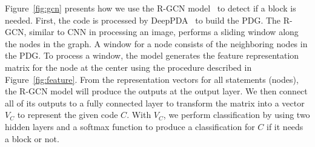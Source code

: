 Figure~\ref{fig:gcn} presents how we use the R-GCN model~\cite{yi} to
detect if a  block is needed.
First, the code is processed by DeepPDA~\cite{icse23} to build
the PDG. The R-GCN, similar to CNN in processing an image, performs
a sliding window along the nodes in the graph. A window for a node
consists of the neighboring nodes in the PDG.
To process a window, the model generates the feature representation
matrix for the node at the center using the procedure described in
Figure~\ref{fig:feature}.
From the representation vectors for all statements (nodes), the R-GCN
model will produce the outputs at the output layer. We then connect
all of its outputs to a fully connected layer to transform the matrix
into a vector $V_C$ to represent the given code $C$. With $V_C$, we
perform classification by using two hidden layers and a softmax
function to produce a classification for $C$ if it needs a
 block or not.



